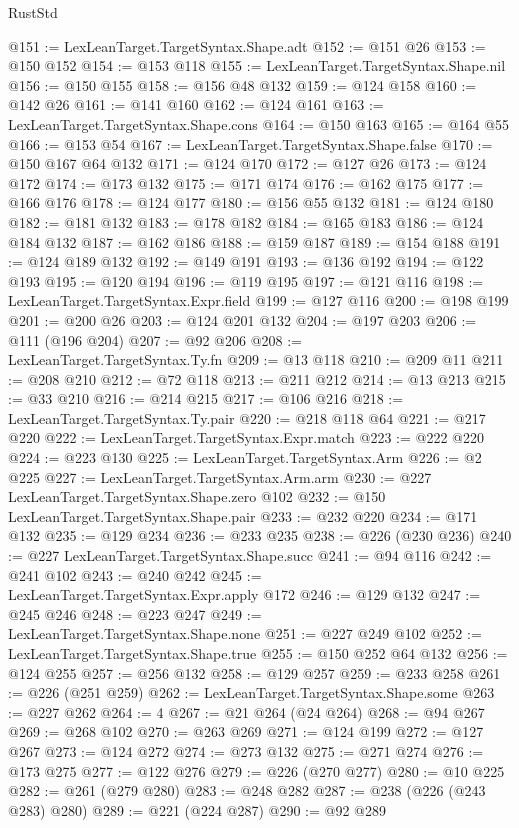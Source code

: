 \begin{lexlean}{RustStd}
\begin{coremodule}
{\begin{coremodule}
{{{{{{{{{{{{{{{{{{{{{{{{{{{{{{{{{{{{{@151 := LexLeanTarget.TargetSyntax.Shape.adt
@152 := @151 @26
@153 := @150 @152
@154 := @153 @118
@155 := LexLeanTarget.TargetSyntax.Shape.nil
@156 := @150 @155
@158 := @156 @48 @132
@159 := @124 @158
@160 := @142 @26
@161 := @141 @160
@162 := @124 @161
@163 := LexLeanTarget.TargetSyntax.Shape.cons
@164 := @150 @163
@165 := @164 @55
@166 := @153 @54
@167 := LexLeanTarget.TargetSyntax.Shape.false
@170 := @150 @167 @64 @132
@171 := @124 @170
@172 := @127 @26
@173 := @124 @172
@174 := @173 @132
@175 := @171 @174
@176 := @162 @175
@177 := @166 @176
@178 := @124 @177
@180 := @156 @55 @132
@181 := @124 @180
@182 := @181 @132
@183 := @178 @182
@184 := @165 @183
@186 := @124 @184 @132
@187 := @162 @186
@188 := @159 @187
@189 := @154 @188
@191 := @124 @189 @132
@192 := @149 @191
@193 := @136 @192
@194 := @122 @193
@195 := @120 @194
@196 := @119 @195
@197 := @121 @116
@198 := LexLeanTarget.TargetSyntax.Expr.field
@199 := @127 @116
@200 := @198 @199
@201 := @200 @26
@203 := @124 @201 @132
@204 := @197 @203
@206 := @111 (@196 @204)
@207 := @92 @206
@208 := LexLeanTarget.TargetSyntax.Ty.fn
@209 := @13 @118
@210 := @209 @11
@211 := @208 @210
@212 := @72 @118
@213 := @211 @212
@214 := @13 @213
@215 := @33 @210
@216 := @214 @215
@217 := @106 @216
@218 := LexLeanTarget.TargetSyntax.Ty.pair
@220 := @218 @118 @64
@221 := @217 @220
@222 := LexLeanTarget.TargetSyntax.Expr.match
@223 := @222 @220
@224 := @223 @130
@225 := LexLeanTarget.TargetSyntax.Arm
@226 := @2 @225
@227 := LexLeanTarget.TargetSyntax.Arm.arm
@230 := @227 LexLeanTarget.TargetSyntax.Shape.zero @102
@232 := @150 LexLeanTarget.TargetSyntax.Shape.pair
@233 := @232 @220
@234 := @171 @132
@235 := @129 @234
@236 := @233 @235
@238 := @226 (@230 @236)
@240 := @227 LexLeanTarget.TargetSyntax.Shape.succ
@241 := @94 @116
@242 := @241 @102
@243 := @240 @242
@245 := LexLeanTarget.TargetSyntax.Expr.apply @172
@246 := @129 @132
@247 := @245 @246
@248 := @223 @247
@249 := LexLeanTarget.TargetSyntax.Shape.none
@251 := @227 @249 @102
@252 := LexLeanTarget.TargetSyntax.Shape.true
@255 := @150 @252 @64 @132
@256 := @124 @255
@257 := @256 @132
@258 := @129 @257
@259 := @233 @258
@261 := @226 (@251 @259)
@262 := LexLeanTarget.TargetSyntax.Shape.some
@263 := @227 @262
@264 := 4
@267 := @21 @264 (@24 @264)
@268 := @94 @267
@269 := @268 @102
@270 := @263 @269
@271 := @124 @199
@272 := @127 @267
@273 := @124 @272
@274 := @273 @132
@275 := @271 @274
@276 := @173 @275
@277 := @122 @276
@279 := @226 (@270 @277)
@280 := @10 @225
@282 := @261 (@279 @280)
@283 := @248 @282
@287 := @238 (@226 (@243 @283) @280)
@289 := @221 (@224 @287)
@290 := @92 @289
}}}}}}}}}}}}}}}}}}}}}}}}}}}}}}}}}}}}}
\end{coremodule}}
\end{coremodule}
\end{lexlean}
